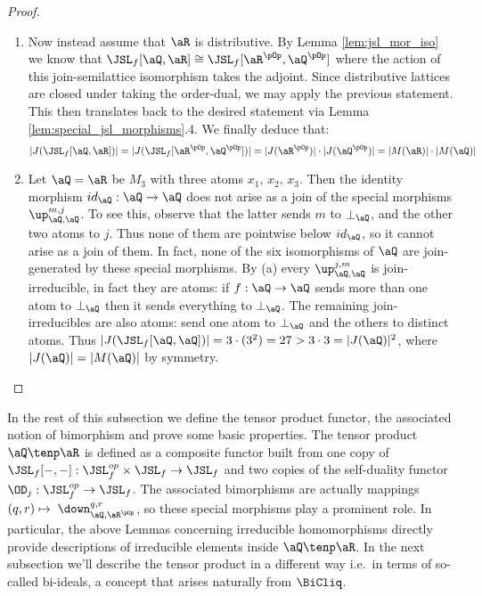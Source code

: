 \documentclass{article}
\begin{document}
\begin{proof}
\begin{enumerate}
\begin{enumerate}
\item
Now instead assume that $\aR$ is distributive. By Lemma \ref{lem:jsl_mor_iso} we know that $\JSL_f[\aQ,\aR] \cong \JSL_f[\aR^{\pOp},\aQ^{\pOp}]$ where the action of this join-semilattice isomorphism takes the adjoint. Since distributive lattices are closed under taking the order-dual, we may apply the previous statement. This then translates back to the desired statement via Lemma \ref{lem:special_jsl_morphisms}.4. We finally deduce that:
\[
|J(\JSL_f[\aQ,\aR])| 
= |J(\JSL_f[\aR^{\pOp},\aQ^{\pOp}])|
= |J(\aR^{\pOp})| \cdot |J(\aQ^{\pOp})|
= |M(\aR)| \cdot |M(\aQ)|
\]

\item
Let $\aQ = \aR$ be $M_3$ with three atoms $x_1,\, x_2, \, x_3$. Then the identity morphism $id_\aQ : \aQ \to \aQ$ does not arise as a join of the special morphisms $\up_{\aQ,\aQ}^{m,j}$. To see this, observe that the latter sends $m$ to $\bot_\aQ$, and the other two atoms to $j$. Thus none of them are pointwise below $id_\aQ$, so it cannot arise as a join of them. In fact, none of the six isomorphisms of $\aQ$ are join-generated by these special morphisms. By (a) every $\up_{\aQ,\aQ}^{j,m}$ is join-irreducible, in fact they are atoms: if $f : \aQ \to \aQ$ sends more than one atom to $\bot_\aQ$ then it sends everything to $\bot_\aQ$. The remaining join-irreducibles are also atoms: send one atom to $\bot_\aQ$ and the others to distinct atoms. Thus $|J(\JSL_f[\aQ,\aQ])| = 3 \cdot (3^2) = 27 > 3 \cdot 3 = |J(\aQ)|^2$, where $|J(\aQ)| = |M(\aQ)|$ by symmetry.

\end{enumerate}

\end{enumerate}
\end{proof}


In the rest of this subsection we define the tensor product functor, the associated notion of bimorphism and prove some basic properties. The tensor product $\aQ \tenp \aR$ is defined as a composite functor built from one copy of $\JSL_f[-,-] : \JSL_f^{op} \times \JSL_f \to \JSL_f$ and two copies of the self-duality functor $\OD_j : \JSL_f^{op} \to \JSL_f$. The associated bimorphisms are actually mappings $(q,r) \mapsto \; \down_{\aQ,\aR^{\pOp}}^{q,r}$, so these special morphisms play a prominent role. In particular, the above Lemmas concerning irreducible homomorphisms directly provide descriptions of irreducible elements inside $\aQ \tenp \aR$. In the next subsection we'll describe the tensor product in a different way i.e.\ in terms of so-called bi-ideals, a concept that arises naturally from $\BiCliq$.
\end{document}
